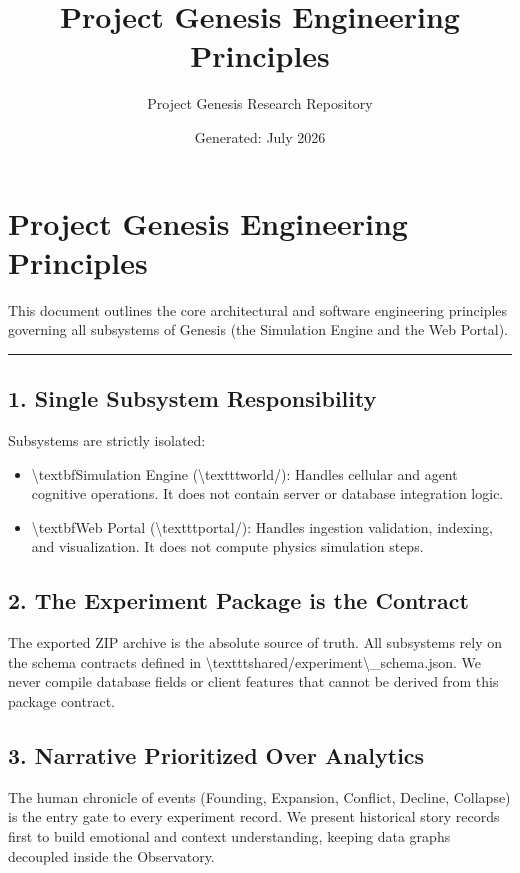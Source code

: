 \documentclass[11pt,a4paper]{article}
\title{\textbf{Project Genesis Engineering Principles}}
\author{Project Genesis Research Repository}
\date{\small Generated: July 2026}
\begin{document}
\maketitle
\thispagestyle{empty}

\newpage
\section*{Project Genesis Engineering Principles}

This document outlines the core architectural and software engineering principles governing all subsystems of Genesis (the Simulation Engine and the Web Portal).

\noindent\rule{\textwidth}{0.4pt}

\subsection*{1. Single Subsystem Responsibility}
Subsystems are strictly isolated:
\begin{itemize}
  \item \textbackslash{}textbf{Simulation Engine (\textbackslash{}texttt{world/})}: Handles cellular and agent cognitive operations. It does not contain server or database integration logic.
  \item \textbackslash{}textbf{Web Portal (\textbackslash{}texttt{portal/})}: Handles ingestion validation, indexing, and visualization. It does not compute physics simulation steps.
\end{itemize}

\subsection*{2. The Experiment Package is the Contract}
The exported ZIP archive is the absolute source of truth. All subsystems rely on the schema contracts defined in \textbackslash{}texttt{shared/experiment\textbackslash{}\_schema.json}. We never compile database fields or client features that cannot be derived from this package contract.

\subsection*{3. Narrative Prioritized Over Analytics}
The human chronicle of events (Founding, Expansion, Conflict, Decline, Collapse) is the entry gate to every experiment record. We present historical story records first to build emotional and context understanding, keeping data graphs decoupled inside the Observatory.
\end{document}
